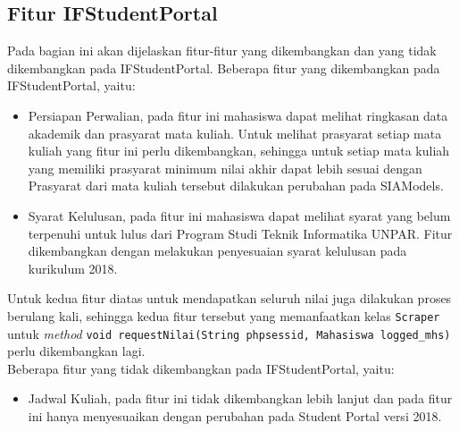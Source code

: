 \subsection{Fitur IFStudentPortal}
Pada bagian ini akan dijelaskan fitur-fitur yang dikembangkan dan yang tidak dikembangkan pada IFStudentPortal. Beberapa fitur yang dikembangkan pada IFStudentPortal, yaitu:
\begin{itemize}
	\item Persiapan Perwalian, pada fitur ini mahasiswa dapat melihat ringkasan data akademik dan prasyarat mata kuliah. Untuk melihat prasyarat setiap mata kuliah yang fitur ini perlu dikembangkan, sehingga untuk setiap mata kuliah yang memiliki prasyarat minimum nilai akhir dapat lebih sesuai dengan Prasyarat dari mata kuliah tersebut dilakukan perubahan pada SIAModels.
	\item Syarat Kelulusan, pada fitur ini mahasiswa dapat melihat syarat yang belum terpenuhi untuk lulus dari Program Studi Teknik Informatika UNPAR. Fitur dikembangkan dengan melakukan penyesuaian syarat kelulusan pada kurikulum 2018.
\end{itemize}
Untuk kedua fitur diatas untuk mendapatkan seluruh nilai juga dilakukan proses berulang kali, sehingga kedua fitur tersebut yang memanfaatkan kelas \texttt{Scraper} untuk \textit{method} \texttt{void requestNilai(String phpsessid, Mahasiswa logged\_mhs)} perlu dikembangkan lagi. \\
Beberapa fitur yang tidak dikembangkan pada IFStudentPortal, yaitu:
\begin{itemize}
	\item Jadwal Kuliah, pada fitur ini tidak dikembangkan lebih lanjut dan pada fitur ini hanya menyesuaikan dengan perubahan pada Student Portal versi 2018. 
\end{itemize}